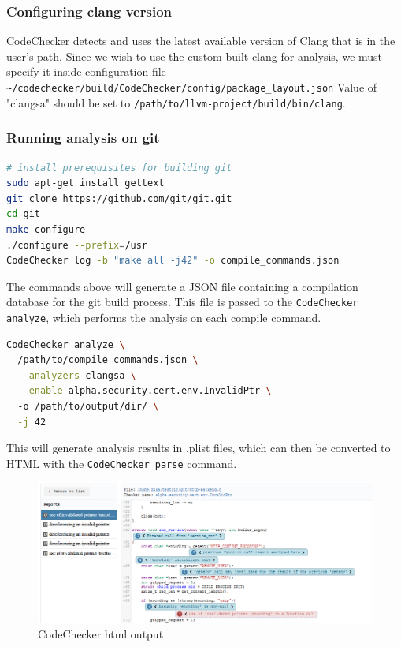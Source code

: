 \subsubsection{Configuring clang version}
CodeChecker detects and uses the latest available version of Clang that is in the user's path. Since we wish to use the custom-built clang for analysis, we must specify it inside configuration file \lstinline{~/codechecker/build/CodeChecker/config/package_layout.json} Value of "clangsa" should be set to \lstinline{/path/to/llvm-project/build/bin/clang}.


\subsubsection{Running analysis on git}

\begin{lstlisting}[language={bash}]
# install prerequisites for building git
sudo apt-get install gettext
git clone https://github.com/git/git.git
cd git
make configure
./configure --prefix=/usr
CodeChecker log -b "make all -j42" -o compile_commands.json
\end{lstlisting}

The commands above will generate a JSON file containing a compilation database for the git build process. This file is passed to the \lstinline{CodeChecker analyze}, which performs the analysis on each compile command.

\begin{lstlisting}[language={bash}]
CodeChecker analyze \
  /path/to/compile_commands.json \
  --analyzers clangsa \
  --enable alpha.security.cert.env.InvalidPtr \ 
  -o /path/to/output/dir/ \
  -j 42
\end{lstlisting}

This will generate analysis results in .plist files, which can then be converted to HTML with the \lstinline{CodeChecker parse} command. 

\begin{figure}[H]
	\centering
	\includegraphics[width=\textwidth]{images/cc_html.PNG}
	\caption{CodeChecker html output}
	\label{fig:cc-html}
\end{figure}

